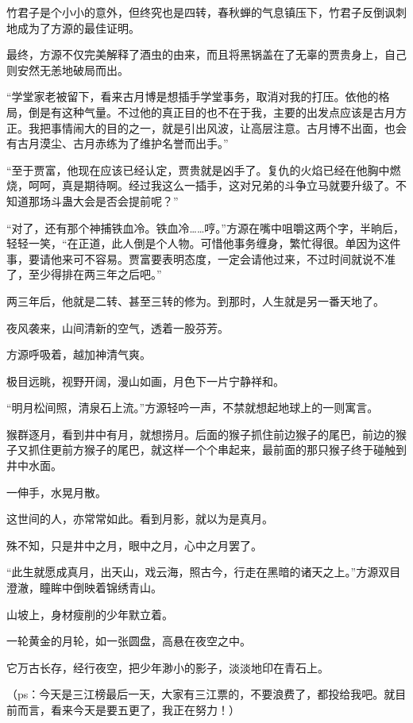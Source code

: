 \begin{this_body}
竹君子是个小小的意外，但终究也是四转，春秋蝉的气息镇压下，竹君子反倒讽刺地成为了方源的最佳证明。

最终，方源不仅完美解释了酒虫的由来，而且将黑锅盖在了无辜的贾贵身上，自己则安然无恙地破局而出。

“学堂家老被留下，看来古月博是想插手学堂事务，取消对我的打压。依他的格局，倒是有这种气量。不过他的真正目的也不在于我，主要的出发点应该是古月方正。我把事情闹大的目的之一，就是引出风波，让高层注意。古月博不出面，也会有古月漠尘、古月赤练为了维护名誉而出手。”

“至于贾富，他现在应该已经认定，贾贵就是凶手了。复仇的火焰已经在他胸中燃烧，呵呵，真是期待啊。经过我这么一插手，这对兄弟的斗争立马就要升级了。不知道那场斗蛊大会是否会提前呢？”

“对了，还有那个神捕铁血冷。铁血冷……哼。”方源在嘴中咀嚼这两个字，半晌后，轻轻一笑，“在正道，此人倒是个人物。可惜他事务缠身，繁忙得很。单因为这件事，要请他来可不容易。贾富要表明态度，一定会请他过来，不过时间就说不准了，至少得排在两三年之后吧。”

两三年后，他就是二转、甚至三转的修为。到那时，人生就是另一番天地了。

夜风袭来，山间清新的空气，透着一股芬芳。

方源呼吸着，越加神清气爽。

极目远眺，视野开阔，漫山如画，月色下一片宁静祥和。

“明月松间照，清泉石上流。”方源轻吟一声，不禁就想起地球上的一则寓言。

猴群逐月，看到井中有月，就想捞月。后面的猴子抓住前边猴子的尾巴，前边的猴子又抓住更前方猴子的尾巴，就这样一个个串起来，最前面的那只猴子终于碰触到井中水面。

一伸手，水晃月散。

这世间的人，亦常常如此。看到月影，就以为是真月。

殊不知，只是井中之月，眼中之月，心中之月罢了。

“此生就愿成真月，出天山，戏云海，照古今，行走在黑暗的诸天之上。”方源双目澄澈，瞳眸中倒映着锦绣青山。

山坡上，身材瘦削的少年默立着。

一轮黄金的月轮，如一张圆盘，高悬在夜空之中。

它万古长存，经行夜空，把少年渺小的影子，淡淡地印在青石上。

（ps：今天是三江榜最后一天，大家有三江票的，不要浪费了，都投给我吧。就目前而言，看来今天是要五更了，我正在努力！）

\end{this_body}

